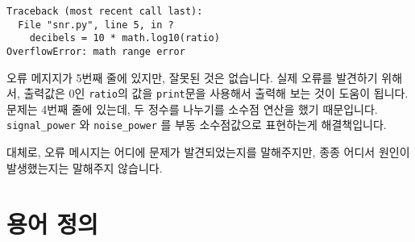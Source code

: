 
\beforeverb
\begin{verbatim}
Traceback (most recent call last):
  File "snr.py", line 5, in ?
    decibels = 10 * math.log10(ratio)
OverflowError: math range error
\end{verbatim}
\afterverb
%

오류 메지지가 5번째 줄에 있지만, 잘못된 것은 없습니다. 실제 오류를 발견하기 위해서, 
출력값은 0인 {\tt ratio}의 값을 {\tt print}문을 사용해서 출력해 보는 것이 도움이 됩니다.
문제는 4번째 줄에 있는데, 두 정수를 나누기를 소수점 연산을 했기 때문입니다. 
\verb"signal_power" 와 \verb"noise_power" 를 부동 소수점값으로  표현하는게 해결책입니다.


대체로, 오류 메시지는 어디에 문제가 발견되었는지를 말해주지만, 종종 어디서 원인이 발생했는지는 말해주지 않습니다.

\section{용어 정의}

